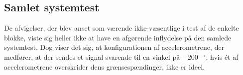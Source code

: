 




\subsection{Samlet systemtest}
De afvigelser, der blev anset som værende ikke-væsentlige i test af de enkelte blokke, viste sig heller ikke at have en afgørende inflydelse på den samlede systemtest. Dog viser det sig, at konfigurationen af accelerometrene, der medfører, at der sendes et signal svarende til en vinkel på $-200-^{\circ}$, hvis ét af accelerometrene overskrider dens grænsespændinger, ikke er ideel.

